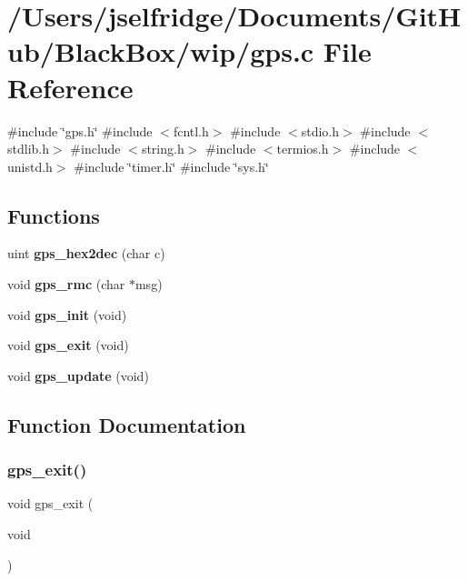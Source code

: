\section{/\+Users/jselfridge/\+Documents/\+Git\+Hub/\+Black\+Box/wip/gps.c File Reference}
\label{gps_8c}
{\ttfamily \#include \char`\"{}gps.\+h\char`\"{}}\newline
{\ttfamily \#include $<$fcntl.\+h$>$}\newline
{\ttfamily \#include $<$stdio.\+h$>$}\newline
{\ttfamily \#include $<$stdlib.\+h$>$}\newline
{\ttfamily \#include $<$string.\+h$>$}\newline
{\ttfamily \#include $<$termios.\+h$>$}\newline
{\ttfamily \#include $<$unistd.\+h$>$}\newline
{\ttfamily \#include \char`\"{}timer.\+h\char`\"{}}\newline
{\ttfamily \#include \char`\"{}sys.\+h\char`\"{}}\newline
\subsection*{Functions}
\begin{DoxyCompactItemize}
\item 
uint \textbf{ gps\+\_\+hex2dec} (char c)
\item 
void \textbf{ gps\+\_\+rmc} (char $\ast$msg)
\item 
void \textbf{ gps\+\_\+init} (void)
\item 
void \textbf{ gps\+\_\+exit} (void)
\item 
void \textbf{ gps\+\_\+update} (void)
\end{DoxyCompactItemize}


\subsection{Function Documentation}
\mbox{\label{gps_8c_a4dc3078b60b9efb9fc6fdd0a5493a878}} 
\subsubsection{gps\+\_\+exit()}
{\footnotesize\ttfamily void gps\+\_\+exit (\begin{DoxyParamCaption}\item[{void}]{ }\end{DoxyParamCaption})}

